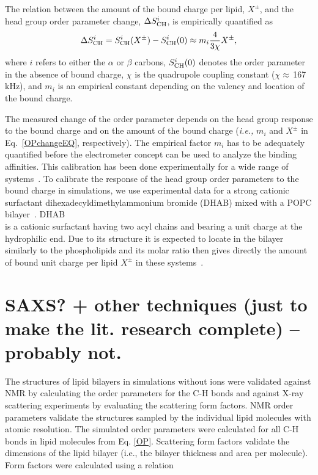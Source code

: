 The relation between the amount of the bound charge per lipid, $X^\pm$, and the head group order parameter change, $\Delta S_{\rm{CH}}^{i}$, is empirically quantified as~\citep{seelig87,ferreira16} 
\begin{equation}\label{OPchangeEQ} 
\Delta S_{\rm{CH}}^{i}= S_{\rm{CH}}^{i}(X^\pm)-S_{\rm{CH}}^{i}(0) \approx m_i \frac{4 }{3\chi}X^\pm, 
\end{equation} 
where $i$ refers to either the $\alpha$ or $\beta$ carbons, $S_{\rm{CH}}^{i}(0)$ denotes the order parameter in the absence of bound charge, $\chi$ is the quadrupole coupling constant ($\chi \approx$\,167\,kHz), and $m_i$ is an empirical constant depending on the valency and location of the bound charge. 
 
 
The measured change of the order parameter depends on the head group response to the bound charge and on the amount of the bound charge (\textit{i.e.,} $m_i$ and $X^\pm$ in Eq.~\ref{OPchangeEQ}, respectively).  
The empirical factor $m_i$ has to be adequately quantified before the electrometer concept can be used to analyze the binding affinities. 
This calibration has been done experimentally for a wide range of systems~\citep{seelig87, beschiasvili91}. 
To calibrate the response of the head group order parameters to the bound charge in simulations, we use experimental data for a strong cationic surfactant dihexadecyldimethylammonium bromide  (DHAB) mixed with a POPC bilayer~\citep{scherer89}. DHAB\\[0.5cm] 
is a cationic surfactant having two acyl chains and bearing a unit charge at the hydrophilic end. 
Due to its structure it is expected to locate in the bilayer similarly to the phospholipids and its molar ratio then gives directly the amount of bound unit charge per lipid $X^\pm$ in these systems~\citep{scherer89}. 
 
\section{SAXS? + other techniques (just to make the lit. research complete) -- probably not.}

The structures of lipid bilayers in simulations without ions were validated against NMR by calculating the order parameters for the C-H bonds and against \mbox{X-ray} scattering experiments by evaluating the scattering form factors. 
NMR order parameters validate the structures sampled by the individual lipid molecules with atomic resolution. 
The simulated order parameters were calculated for all C-H bonds in lipid molecules from Eq. \ref{OP}. 
Scattering form factors validate the dimensions of the lipid bilayer (i.e., the bilayer thickness and area per molecule). 
Form factors were calculated using a relation 
 
